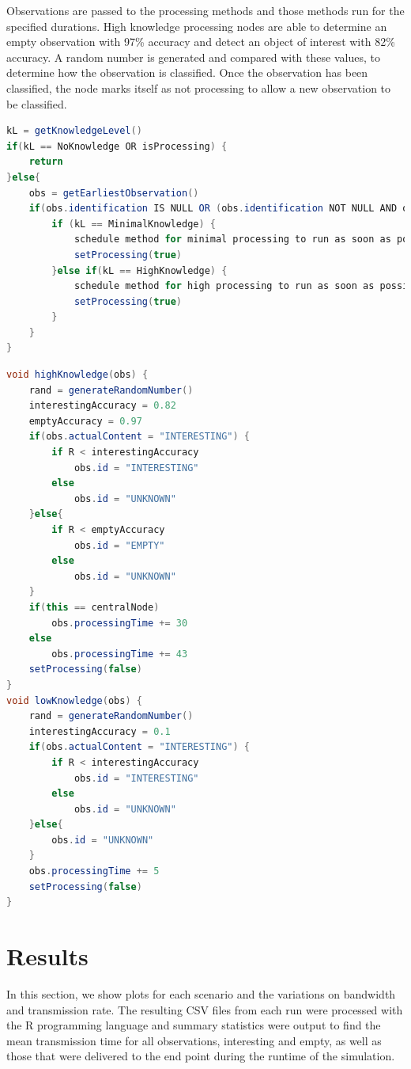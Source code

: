 Observations are passed to the processing methods and those methods run for the specified durations. High knowledge processing nodes are able to determine an empty observation with 97\% accuracy and detect an object of interest with 82\% accuracy. A random number is generated and compared with these values, to determine how the observation is classified. Once the observation has been classified, the node marks itself as not processing to allow a new observation to be classified. 

\begin{lstlisting}[breaklines=true, caption={Processing Function for DA and DP Nodes}, label={alg:sim:proc}, language=java]
kL = getKnowledgeLevel()
if(kL == NoKnowledge OR isProcessing) {
	return
}else{
	obs = getEarliestObservation()
	if(obs.identification IS NULL OR (obs.identification NOT NULL AND obs.identifiedBy.getKnowledgeLevel() < kL)) {
		if (kL == MinimalKnowledge) {
			schedule method for minimal processing to run as soon as possible for 5 ticks
			setProcessing(true)
		}else if(kL == HighKnowledge) {
			schedule method for high processing to run as soon as possible for 43 ticks
			setProcessing(true)
		}
	}
}
\end{lstlisting}
\vfill
\begin{lstlisting}[breaklines=true, caption={Processing Functions for Nodes}, label={alg:sim:know}, language=java]
void highKnowledge(obs) {
	rand = generateRandomNumber()
	interestingAccuracy = 0.82
	emptyAccuracy = 0.97
	if(obs.actualContent = "INTERESTING") {
		if R < interestingAccuracy
			obs.id = "INTERESTING"
		else
			obs.id = "UNKNOWN"
	}else{
		if R < emptyAccuracy
			obs.id = "EMPTY"
		else
			obs.id = "UNKNOWN"
	}
	if(this == centralNode)
		obs.processingTime += 30
	else
		obs.processingTime += 43
	setProcessing(false)
}
void lowKnowledge(obs) {
	rand = generateRandomNumber()
	interestingAccuracy = 0.1
	if(obs.actualContent = "INTERESTING") {
		if R < interestingAccuracy
			obs.id = "INTERESTING"
		else
			obs.id = "UNKNOWN"
	}else{
		obs.id = "UNKNOWN"
	}
	obs.processingTime += 5
	setProcessing(false)
}

\end{lstlisting}

\section{Results}\label{sim:res}
In this section, we show plots for each scenario and the variations on bandwidth and transmission rate. The resulting CSV files from each run were processed with the R programming language \cite{rlang} and summary statistics were output to find the mean transmission time for all observations, interesting and empty, as well as those that were delivered to the end point during the runtime of the simulation.

